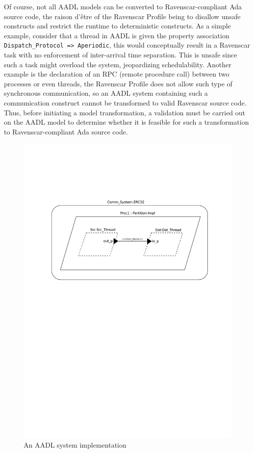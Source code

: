 Of course, not all AADL models can be converted to Ravenscar-compliant
Ada source code, the raison d'\^etre of the Ravenscar Profile being to
disallow unsafe constructs and restrict the runtime to deterministic
constructs. As a simple example, consider that a thread in AADL is
given the property association \texttt{Dispatch\_Protocol =>
  Aperiodic}, this would conceptually result in a Ravenscar task with
no enforcement of inter-arrival time separation. This is unsafe since
such a task might overload the system, jeopardizing
schedulability. Another example is the declaration of an RPC (remote
procedure call) between two processes or even threads, the Ravenscar
Profile does not allow such type of synchronous communication, so an
AADL system containing such a communication construct cannot be
transformed to valid Ravenscar source code. Thus, before initiating a
model transformation, a validation must be carried out on the AADL
model to determine whether it is feasible for such a transformation to
Ravenscar-compliant Ada source code.

\begin{figure}
\centering
\includegraphics[scale=0.7]{figs/aadl_ex}
\caption{An AADL system implementation}
\label{fig:aadl_ex}
\end{figure}

